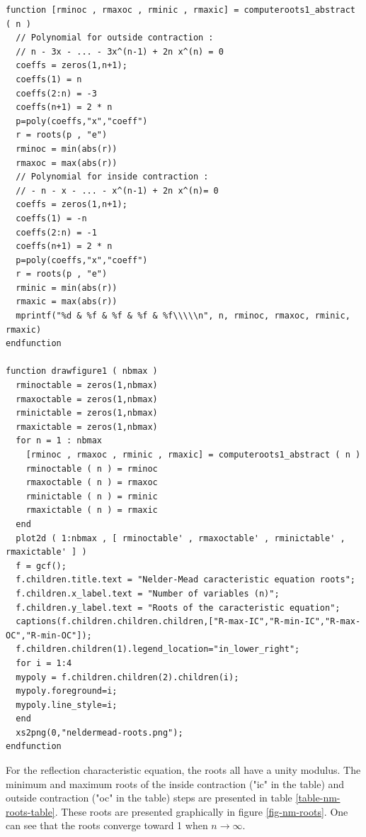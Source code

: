 \lstset{language=Scilab}
\lstset{numbers=left}
\lstset{basicstyle=\footnotesize}
\lstset{keywordstyle=\bfseries}
\begin{lstlisting}
function [rminoc , rmaxoc , rminic , rmaxic] = computeroots1_abstract ( n )
  // Polynomial for outside contraction :
  // n - 3x - ... - 3x^(n-1) + 2n x^(n) = 0
  coeffs = zeros(1,n+1);
  coeffs(1) = n
  coeffs(2:n) = -3
  coeffs(n+1) = 2 * n
  p=poly(coeffs,"x","coeff")
  r = roots(p , "e")
  rminoc = min(abs(r))
  rmaxoc = max(abs(r))
  // Polynomial for inside contraction :
  // - n - x - ... - x^(n-1) + 2n x^(n)= 0
  coeffs = zeros(1,n+1);
  coeffs(1) = -n
  coeffs(2:n) = -1
  coeffs(n+1) = 2 * n
  p=poly(coeffs,"x","coeff")
  r = roots(p , "e")
  rminic = min(abs(r))
  rmaxic = max(abs(r))
  mprintf("%d & %f & %f & %f & %f\\\\\n", n, rminoc, rmaxoc, rminic, rmaxic)
endfunction

function drawfigure1 ( nbmax )
  rminoctable = zeros(1,nbmax)
  rmaxoctable = zeros(1,nbmax)
  rminictable = zeros(1,nbmax)
  rmaxictable = zeros(1,nbmax)
  for n = 1 : nbmax
    [rminoc , rmaxoc , rminic , rmaxic] = computeroots1_abstract ( n )
    rminoctable ( n ) = rminoc
    rmaxoctable ( n ) = rmaxoc
    rminictable ( n ) = rminic
    rmaxictable ( n ) = rmaxic
  end
  plot2d ( 1:nbmax , [ rminoctable' , rmaxoctable' , rminictable' , rmaxictable' ] )
  f = gcf();
  f.children.title.text = "Nelder-Mead caracteristic equation roots";
  f.children.x_label.text = "Number of variables (n)";
  f.children.y_label.text = "Roots of the caracteristic equation";
  captions(f.children.children.children,["R-max-IC","R-min-IC","R-max-OC","R-min-OC"]);
  f.children.children(1).legend_location="in_lower_right";
  for i = 1:4
  mypoly = f.children.children(2).children(i);
  mypoly.foreground=i;
  mypoly.line_style=i;
  end
  xs2png(0,"neldermead-roots.png");
endfunction
\end{lstlisting}

For the reflection characteristic equation, the roots all have 
a unity modulus.
The minimum and maximum roots of the inside contraction ("ic" in the table) and 
outside contraction ("oc" in the table) steps are 
presented in table \ref{table-nm-roots-table}. These 
roots are presented graphically in figure \ref{fig-nm-roots}.
One can see that the roots converge toward 1 when $n\rightarrow \infty$.


